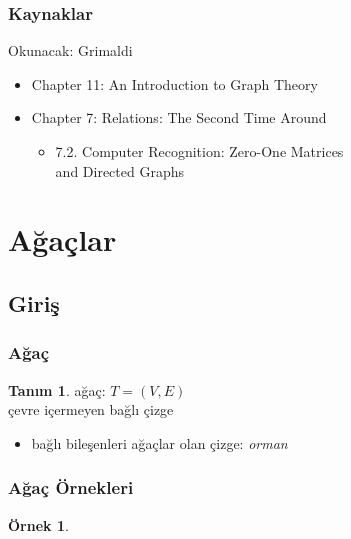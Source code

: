 \documentclass[dvipsnames]{beamer}
\theoremstyle{definition}
\newtheorem{tanim}[theorem]{Tanım}
\theoremstyle{example}
\newtheorem{ornek}[theorem]{Örnek}
\theoremstyle{plain}
\begin{document}
\begin{frame}
  \frametitle{Kaynaklar}

  \begin{block}{Okunacak: Grimaldi}
    \begin{itemize}
      \item Chapter 11: \alert{An Introduction to Graph Theory}

      \item Chapter 7: Relations: The Second Time Around
      \begin{itemize}
        \item 7.2. \alert{Computer Recognition: Zero-One Matrices\\
                          and Directed Graphs}
      \end{itemize}
    \end{itemize}
  \end{block}
\end{frame}

\section{Ağaçlar}

\subsection{Giriş}

\begin{frame}
  \frametitle{Ağaç}

  \begin{tanim}
    \alert{ağaç}: $T=(V,E)$\\
    çevre içermeyen bağlı çizge
  \end{tanim}

  \pause
  \begin{itemize}
    \item bağlı bileşenleri ağaçlar olan çizge: \emph{orman}
  \end{itemize}
\end{frame}

\begin{frame}
  \frametitle{Ağaç Örnekleri}

  \begin{ornek}
    \begin{center}
    \end{center}
  \end{ornek}
\end{frame}
\end{document}
